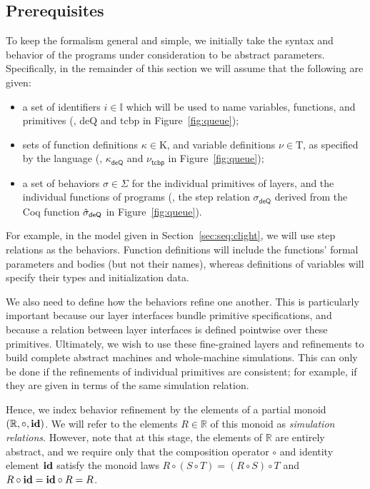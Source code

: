 \subsection{Prerequisites}

To keep the formalism general and simple,
we initially take the syntax and behavior of the programs
under consideration to be abstract parameters.
Specifically,
in the remainder of this section we will assume that
the following are given:
\begin{itemize}
\item a set of identifiers $i \in \mathbb{I}$
    which will be used to name variables, functions, and primitives
    (\eg, \textsf{deQ} and \textsf{tcbp} in Figure~\ref{fig:queue});
\item sets of function definitions $\kappa \in \mathrm{K}$, and
    variable definitions $\nu \in \mathrm{T}$,
    as specified by the language
    (\eg, $\kappa_\textsf{deQ}$ and $\nu_\textsf{tcbp}$ in Figure~\ref{fig:queue});
\item a set of behaviors $\sigma \in \Sigma$
    for the individual primitives of layers,
    and the individual functions of programs
    (\eg, the step relation $\sigma_\textsf{deQ}$ 
    	derived from the Coq function 
    	$\hat{\sigma}_\textsf{deQ}$ in Figure~\ref{fig:queue}).
\end{itemize}
For example, in the model given in Section~\ref{sec:seq:clight},
we will use step relations as the behaviors.
Function definitions will include the functions' formal parameters and bodies
(but not their names),
whereas definitions of variables
will specify their types and initialization data.

We also need to define how the behaviors
refine one another.
This is particularly important because
our layer interfaces bundle primitive specifications,
and because a relation between layer interfaces is defined pointwise
over these primitives. Ultimately, we wish to use these
fine-grained layers and refinements to build complete abstract
machines and whole-machine simulations. 
This can only be done
if the refinements of individual primitives are consistent;
for example, if they are given in terms of the same simulation relation.

Hence, we index behavior refinement by
the elements of a partial monoid $(\mathbb{R}, \circ, \textbf{id})$.
We will refer to the elements $R \in \mathbb{R}$ of this monoid
as \emph{simulation relations}.
However, note that at this stage,
the elements of $\mathbb{R}$ are entirely abstract,
and we require only that the composition operator $\circ$
and identity element $\textbf{id}$ satisfy the monoid laws
$R \circ (S \circ T) = (R \circ S) \circ T$ and
$R \circ \textbf{id} = \textbf{id} \circ R = R$.

